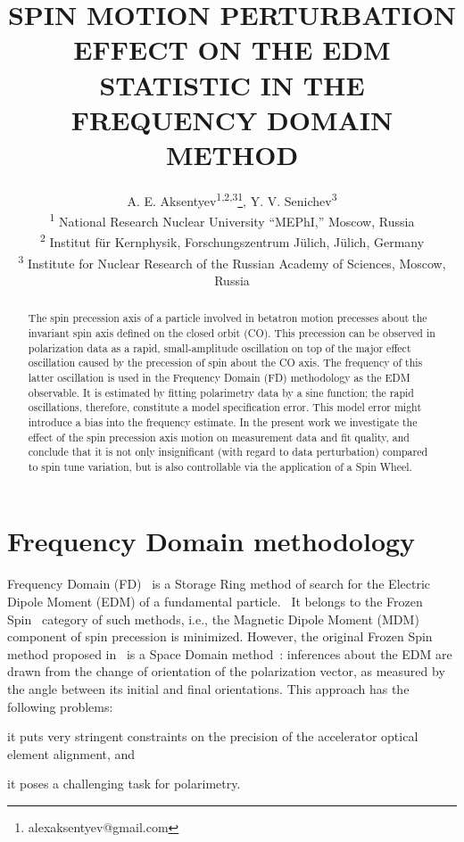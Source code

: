 \documentclass[a4paper]{jacow}
\begin{document}
\title{SPIN MOTION PERTURBATION EFFECT ON THE EDM STATISTIC IN THE FREQUENCY DOMAIN METHOD}
\author{A. E. Aksentyev\textsuperscript{1,2,3}\thanks{alexaksentyev@gmail.com},
  Y. V. Senichev\textsuperscript{3} \\
  \textsuperscript{1} National Research Nuclear University ``MEPhI,'' Moscow, Russia \\
  \textsuperscript{2} Institut f\"ur Kernphysik, Forschungszentrum J\"ulich, J\"ulich, Germany\\
  \textsuperscript{3} Institute for Nuclear Research of the Russian Academy of Sciences, Moscow, Russia}
\maketitle

\begin{abstract}
  The spin precession axis of a particle involved in betatron motion precesses about the invariant spin axis
  defined on the closed orbit (CO). This precession can be observed in polarization data as a rapid,
  small-amplitude oscillation on top of the major effect oscillation caused by the precession of spin
  about the CO axis. The frequency of this latter oscillation is used in the Frequency Domain (FD) methodology
  as the EDM observable. It is estimated by fitting polarimetry data by a sine function; the rapid
  oscillations, therefore, constitute a model specification error.
  This model error might introduce a bias into the frequency estimate. In the present work we investigate
  the effect of the spin precession axis motion on measurement data and fit quality, and conclude that it
  is not only insignificant (with regard to data perturbation) compared to spin tune variation,
  but is also controllable via the application of a Spin Wheel.
\end{abstract}

\section{Frequency Domain methodology}
Frequency Domain (FD)~\cite{Senichev:2017amn} is a Storage Ring method of search for the
Electric Dipole Moment (EDM) of a fundamental particle.~\cite{BNL:SREDM}
It belongs to the Frozen Spin~\cite{BNL:Deuteron2008} category
of such methods, i.e., the Magnetic Dipole Moment (MDM) component of spin precession is minimized. However,
the original Frozen Spin method proposed in~\cite{BNL:Deuteron2008} is a Space Domain
method~\cite[p.~4]{Talman:ElectricRings}: inferences about the EDM are drawn from the change of orientation
of the polarization vector, as measured by the angle between its initial and final orientations. This approach
has the following problems:
\begin{inparaenum}
\item it puts very stringent constraints on the precision of the accelerator optical element alignment, and
\item it poses a challenging task for polarimetry.~\cite[p.~6]{Mane:2015jsa}
\end{inparaenum}
\end{document}
